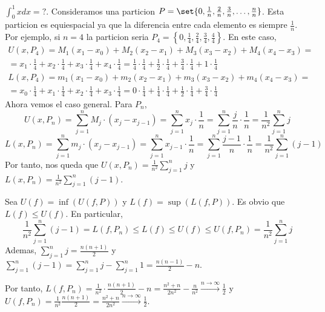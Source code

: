 \begin{example}
	\(\int^{1}_{0} x dx  = ? \). Consideramos una particion \(P = \set{0, \frac{1}{n}, \frac{2}{n}, \frac{3}{n}, \ldots, \frac{n}{n}}\). Esta particion es equiespacial ya que la diferencia entre cada elemento es siempre \(\frac{1}{n }\). Por ejemplo, si \(n = 4 \) la particion seria \(P_4 = \left \{0,\frac{1}{4}, \frac{2}{4}, \frac{3}{4}, \frac{4}{4}\right \}\). En este caso,
	\begin{multline*}
		U(x, P_4) = M_1 (x_1 - x_0) + M_2 (x_2 - x_1) + M_3(x_3 - x_2) + M_4 (x_4 - x_3) = \\ = x_1 \cdot \frac{1}{4} + x_2 \cdot \frac{1}{4} + x_3 \cdot \frac{1}{4} + x_4 \cdot \frac{1}{4} =  \frac{1}{4} \cdot \frac{1}{4} + \frac{1}{2} \cdot \frac{1}{4} + \frac{3}{4} \cdot \frac{1}{4} + 1 \cdot \frac{1}{4}
	\end{multline*}
	\begin{multline*}
		L(x, P_4) = m_1 (x_1 - x_0) + m_2 (x_2 - x_1) + m_3(x_3 - x_2) + m_4 (x_4 - x_3) = \\ = x_0 \cdot \frac{1}{4} + x_1 \cdot \frac{1}{4} + x_2 \cdot \frac{1}{4} + x_3 \cdot \frac{1}{4} =  0 \cdot \frac{1}{4} + \frac{1}{4} \cdot \frac{1}{4} + \frac{1}{2} \cdot \frac{1}{4} + \frac{3}{4} \cdot \frac{1}{4}
	\end{multline*}
	Ahora vemos el caso general. Para \(P_n \),
	\[
		U(x, P_n) = \sum_{j =1}^{n } M_j \cdot (x_j - x_{j-1}) = \sum_{j =1}^{n } x_j \cdot \frac{1}{n} = \sum_{j =1}^{n } \frac{j}{n} \cdot \frac{1}{n} = \frac{1}{n^{2} }  \sum_{j =1}^{n } j
	\]
	\[
		L(x, P_n) = \sum_{j =1}^{n } m_j \cdot (x_j - x_{j-1}) = \sum_{j =1}^{n } x_{j-1} \cdot \frac{1}{n} = \sum_{j =1}^{n } \frac{j-1}{n} \cdot \frac{1}{n} = \frac{1}{n^{2} }  \sum_{j =1}^{n } (j - 1)
	\]
	Por tanto, nos queda que \(U(x, P_n) = \frac{1}{n^{2} } \sum_{j =1}^{n } j\) y \(L(x,P_n) = \frac{1}{n^{2} } \sum_{j =1}^{n } (j - 1)\).

	Sea \(U(f) = \inf (U(f,P)) \) y \(L(f) = \sup (L(f,P ))\). Es obvio que \(L(f) \leq U(f )\). En particular,
	\[
		\frac{1}{n^{2} } \sum_{j =1}^{n } (j - 1) = L(f, P_n) \leq L(f) \leq U(f) \leq U(f,P_n) = \frac{1}{n^{2} } \sum_{j =1}^{n } j
	\]
	Ademas, \(\sum_{j =1}^{n } j = \frac{n (n + 1)}{2 }\) y \(\sum_{j =1}^{n } (j - 1) = \sum_{j=1}^{n} j - \sum_{j =1}^{n } 1 = \frac{n(n-1)}{2} - n \).

	Por tanto, \(L(f, P_n) = \frac{1}{n^{2} } \cdot \frac{n(n + 1)}{2} - n = \frac{n^{2} + n}{2n^{2} } - \frac{n }{n^{2} } \overset{n \rightarrow \infty}{\longrightarrow} \frac{1}{2}\) y \(U(f,P_n) = \frac{1}{n^{2} } \frac{n(n + 1)}{2} = \frac{n^{2} + n }{2n^{2} } \overset{n \rightarrow \infty}{\longrightarrow} \frac{1}{2}\).


\end{example}

